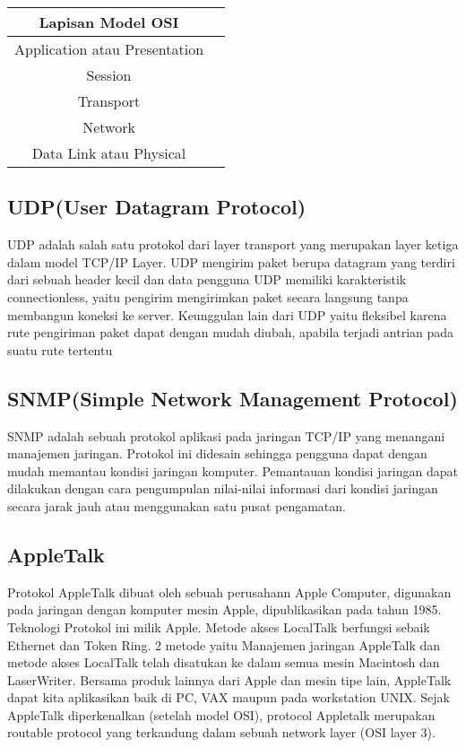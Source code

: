 \begin{table} [h]
\begin {tabular} {|cc|}
\hline
Lapisan Model OSI & \\
\hline
Application atau Presentation & \\
\hline
Session & \\
\hline
Transport & \\
\hline
Network & \\
\hline
Data Link atau Physical & \\
\hline
\end{tabular}
\end{table} 
  
 \subsection{UDP(User Datagram Protocol)}
UDP adalah salah satu protokol dari layer transport yang merupakan layer ketiga dalam model TCP/IP Layer.
UDP mengirim paket berupa datagram yang terdiri dari sebuah header kecil dan data pengguna UDP memiliki karakteristik connectionless, 
yaitu pengirim mengirimkan paket secara langsung tanpa membangun koneksi ke server. 
Keunggulan lain dari UDP yaitu fleksibel karena rute pengiriman paket dapat dengan mudah diubah, apabila terjadi antrian pada suatu rute tertentu 
 
 \subsection{SNMP(Simple Network Management Protocol)}
SNMP adalah sebuah protokol aplikasi pada jaringan TCP/IP yang menangani manajemen jaringan. 
Protokol ini didesain sehingga pengguna dapat dengan mudah memantau kondisi jaringan komputer. 
Pemantauan kondisi jaringan dapat dilakukan dengan cara pengumpulan nilai-nilai informasi dari kondisi jaringan secara jarak jauh atau 
menggunakan satu pusat pengamatan.
  
 \subsection{AppleTalk} 
Protokol AppleTalk dibuat oleh sebuah perusahann Apple Computer, digunakan pada jaringan dengan komputer mesin Apple, dipublikasikan 
pada tahun 1985. Teknologi Protokol ini milik Apple. Metode akses LocalTalk berfungsi sebaik Ethernet dan Token Ring. 2 metode yaitu 
Manajemen jaringan AppleTalk dan metode akses LocalTalk telah disatukan ke dalam semua mesin Macintosh dan LaserWriter. Bersama produk 
lainnya dari Apple dan mesin tipe lain, AppleTalk dapat kita aplikasikan  baik di PC, VAX maupun  pada workstation UNIX. Sejak AppleTalk 
diperkenalkan (setelah model OSI), protocol Appletalk merupakan routable protocol yang terkandung dalam sebuah network layer (OSI layer 
3). 

